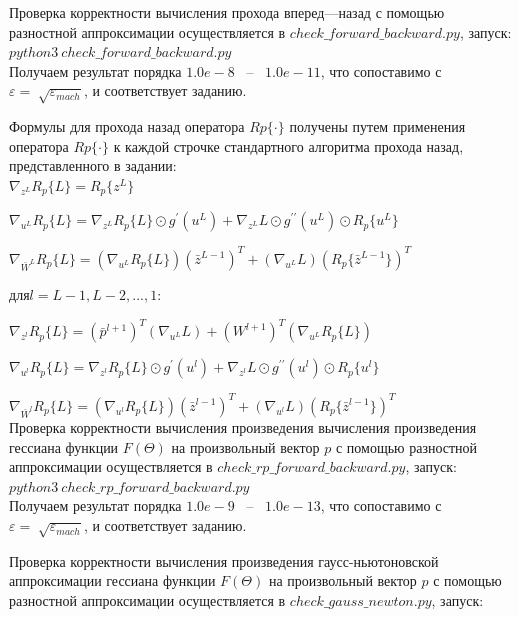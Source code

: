 \documentclass[oneside,final,12pt]{extreport}
\begin{document}
Проверка корректности вычисления прохода вперед---назад с помощью разностной аппроксимации осуществляется в $check\_forward\_backward.py$, запуск:\\


$python3 \ check\_forward\_backward.py$ \\


Получаем результат порядка $1.0e-8$ \ -- \ $1.0e-11$, что сопоставимо с $\varepsilon=\sqrt[]{\varepsilon_{mach}}$, и соответствует заданию.

Формулы для прохода назад оператора $Rp\{·\}$ получены путем применения оператора $Rp\{·\}$ к каждой строчке стандартного алгоритма прохода назад, представленного в задании:\\


$\nabla _{z^L}R_p\{L\} = R_p\{z^L\}$


$\nabla _{u^L}R_p\{L\} = \nabla _{z^L}R_p\{L\} \odot g^\prime(u^L) + \nabla _{z^L}L  \odot g^{\prime\prime}(u^L) \odot R_p\{u^L\}$


$\nabla _{\bar W^L}R_p\{L\} = (\nabla _{u^L}R_p\{L\})(\bar z^{L-1})^T + (\nabla _{u^L}L)(R_p\{\bar z^{L-1}\})^T$


$для l=L-1,L-2,...,1:$


$\nabla _{z^l}R_p\{L\} = (\bar p^{l+1})^T (\nabla _{u^L}L) + (W^{l+1})^T(\nabla _{u^L}R_p\{L\})$


$\nabla _{u^l}R_p\{L\} = \nabla _{z^l}R_p\{L\} \odot g^\prime(u^l) + \nabla _{z^l}L  \odot g^{\prime\prime}(u^l) \odot R_p\{u^l\}$


$\nabla _{\bar W^l}R_p\{L\} = (\nabla _{u^l}R_p\{L\})(\bar z^{l-1})^T + (\nabla _{u^l}L)(R_p\{\bar z^{l-1}\})^T$ \\


Проверка корректности вычисления произведения вычисления произведения гессиана функции $F(\Theta)$ на произвольный вектор $p$ с помощью разностной аппроксимации осуществляется в $check\_rp\_forward\_backward.py$, запуск:\\


$python3 \ check\_rp\_forward\_backward.py$ \\


Получаем результат порядка $1.0e-9$ \ -- \ $1.0e-13$, что сопоставимо с $\varepsilon=\sqrt[]{\varepsilon_{mach}}$, и соответствует заданию.


Проверка корректности вычисления произведения гаусс-ньютоновской аппроксимации гессиана функции $F(\Theta)$ на произвольный вектор $p$ с помощью разностной аппроксимации осуществляется в $check\_gauss\_newton.py$, запуск:\\
\end{document}
